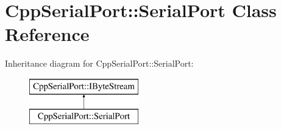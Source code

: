\hypertarget{class_cpp_serial_port_1_1_serial_port}{}\section{Cpp\+Serial\+Port\+:\+:Serial\+Port Class Reference}
\label{class_cpp_serial_port_1_1_serial_port}
Inheritance diagram for Cpp\+Serial\+Port\+:\+:Serial\+Port\+:\begin{figure}[H]
\begin{center}
\leavevmode
\includegraphics[height=2.000000cm]{class_cpp_serial_port_1_1_serial_port}
\end{center}
\end{figure}
